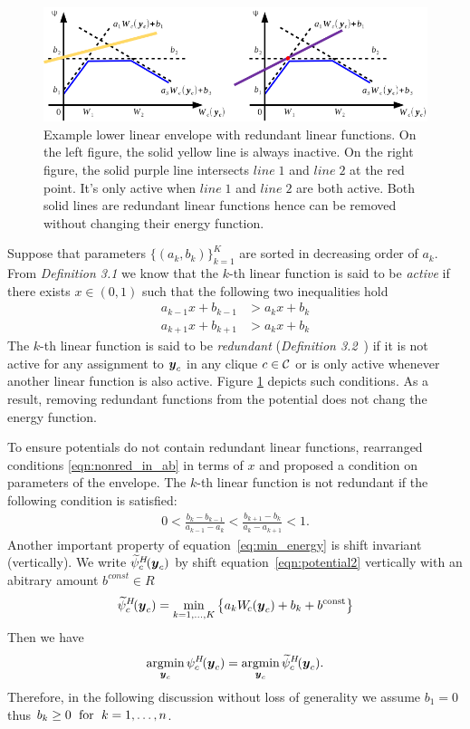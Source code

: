 \begin{figure}[ht]
  \centering
  \includegraphics[width=1\columnwidth]{Methodology/figures/redundant}
  \caption{\label{fig:redundant} Example lower linear envelope
    with redundant linear functions. On the left figure, the
    solid yellow line is always inactive. On the right figure,
    the solid purple line intersects $line \; 1$ and $line \; 2$
    at the red point. It's only active when $line \; 1$ and $line
    \; 2$ are both active. Both solid lines are redundant linear
    functions hence can be removed without changing their energy
    function.}
\end{figure}
%
Suppose that parameters $\{(a_k, b_k)\}_{k=1}^K$ are sorted in
decreasing order of $a_k$. From \emph{Definition 3.1}
\cite{gouldlearning} we know that the $k$-th linear function is
said to be \emph{active} if there exists $x \in (0, 1)$ such that
the following two inequalities hold
\begin{align}
  a_{k-1} x + b_{k-1} &> a_k x + b_k \nonumber \\
  a_{k+1} x + b_{k+1} &> a_k x + b_k
  \label{eqn:nonred_in_ab}
\end{align}
%
The $k$-th linear function is said to be \emph{redundant}
(\emph{Definition 3.2}~\cite{gouldlearning}) if it is not active
for any assignment to ${\boldsymbol{y}}_c$ in any clique $c \in {\cal C}$ or is only
active whenever another linear function is also active.
Figure \ref{fig:redundant} depicts such conditions. As a
result, removing redundant functions from the potential does not
chang the energy function.

To ensure potentials do not contain redundant linear functions,
 rearranged conditions
\ref{eqn:nonred_in_ab} in terms of $x$ and proposed a condition on
parameters of the envelope. The $k$-th linear function is
not redundant if the following condition is satisfied:
%
\begin{align}
    0
    <
    \frac{b_k - b_{k-1}}{a_{k-1} - a_k}
    <
    \frac{b_{k+1} - b_k}{a_k - a_{k+1}}
    <
    1.
  \label{eq:nonredundant}
\end{align}
%
Another important property of equation~\eqref{eq:min_energy} is
shift invariant~\cite{gouldlearning} (vertically). We write
$\widetilde{\psi}^{H}_c\!({\boldsymbol{y}}_c)$ by shift equation~\eqref{eqn:potential2} vertically
with an abitrary amount $b^{const}\in R$
$$\widetilde{\psi}^{H}_c\!({\boldsymbol{y}}_c) = \min_{k=1, \ldots, K}
\left\{a_k W_{\!c}({\boldsymbol{y}}_c) + b_k + b^\textrm{const} \right\}$$
%
Then we have
\begin{align}
  \mathop{\textrm{argmin}}_{{\boldsymbol{y}}_c} \psi^H_c\!({\boldsymbol{y}}_c)
  = \mathop{\textrm{argmin}}_{{\boldsymbol{y}}_c} \widetilde{\psi}^{H}_c\!({\boldsymbol{y}}_c).
  \label{eq:shift_invariant}
\end{align}
%
Therefore, in the following discussion without loss of generality
we assume $b_1 = 0$ thus $b_k\geq0 \text{\; for \;} k=1,\dots,n$.
%
